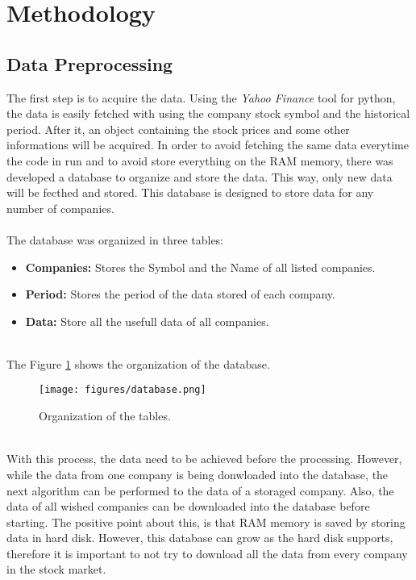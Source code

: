 \section{Methodology}
\label{sec:methodology}

\subsection{Data Preprocessing}
The first step is to acquire the data. Using the \textit{Yahoo Finance} tool for python, the data is easily fetched with using the company stock symbol and the historical period. After
it, an object containing the stock prices and some other informations will be acquired. In order to avoid fetching the same data everytime the code in run and to avoid store everything 
on the RAM memory, there was developed a database to organize and store the data. This way, only new data will be fecthed and stored. This database is designed to store data for any number
of companies.\\
\\
The database was organized in three tables:
\begin{itemize}
 \item \textbf{Companies:} Stores the Symbol and the Name of all listed companies.\\
 \item \textbf{Period:} Stores the period of the data stored of each company.\\
 \item \textbf{Data:} Store all the usefull data of all companies.\\
\end{itemize}
\ \\
The Figure \ref{fig:db} shows the organization of the database.
\\
\begin{figure}[H]
\centering
\texttt{[image: figures/database.png]}
\caption{Organization of the tables.}
\label{fig:db}
\end{figure}
\ \\
With this process, the data need to be achieved before the processing. However, while the data from one company is being donwloaded into the database, the next algorithm can be performed
to the data of a storaged company. Also, the data of all wished companies can be downloaded into the database before starting. The positive point about this, is that RAM memory is saved
by storing data in hard disk. However, this database can grow as the hard disk supports, therefore it is important to not try to download all the data from every company in the stock market.

